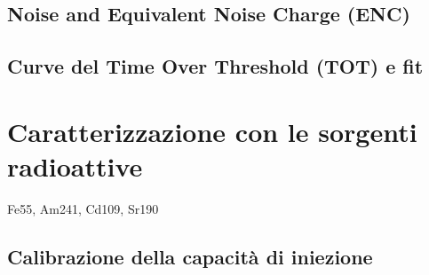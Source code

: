 \subsection{Noise and Equivalent Noise Charge (ENC)}

\subsection{Curve del Time Over Threshold (TOT) e fit}

\section{Caratterizzazione con le sorgenti radioattive}

Fe55, Am241, Cd109, Sr190

\subsection{Calibrazione della capacità di iniezione}







